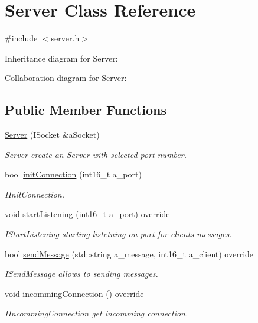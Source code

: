 \hypertarget{classServer}{}\section{Server Class Reference}
\label{classServer}


{\ttfamily \#include $<$server.\+h$>$}



Inheritance diagram for Server\+:


Collaboration diagram for Server\+:
\subsection*{Public Member Functions}
\begin{DoxyCompactItemize}
\item 
\hyperlink{classServer_aded96e969ba0101d4edd6ec60636714e}{Server} (I\+Socket \&a\+Socket)
\begin{DoxyCompactList}\small\item\em \hyperlink{classServer}{Server} create an \hyperlink{classServer}{Server} with selected port number. \end{DoxyCompactList}\item 
bool \hyperlink{classServer_ad3a42e12720f9f0ad9a380c294aec712}{init\+Connection} (int16\+\_\+t a\+\_\+port)
\begin{DoxyCompactList}\small\item\em I\+Init\+Connection. \end{DoxyCompactList}\item 
void \hyperlink{classServer_aac25c7d3ab23c188bd7db94bd5743315}{start\+Listening} (int16\+\_\+t a\+\_\+port) override
\begin{DoxyCompactList}\small\item\em I\+Start\+Listening starting listetning on port for clients messages. \end{DoxyCompactList}\item 
bool \hyperlink{classServer_a663a746787de8b7857562f9de7d0b165}{send\+Message} (std\+::string a\+\_\+message, int16\+\_\+t a\+\_\+client) override
\begin{DoxyCompactList}\small\item\em I\+Send\+Message allows to sending messages. \end{DoxyCompactList}\item 
void \hyperlink{classServer_ae2348adb4c3a2935b164f7352c3631dc}{incomming\+Connection} () override
\begin{DoxyCompactList}\small\item\em I\+Incomming\+Connection get incomming connection. \end{DoxyCompactList}\item 

\end{DoxyCompactItemize}
